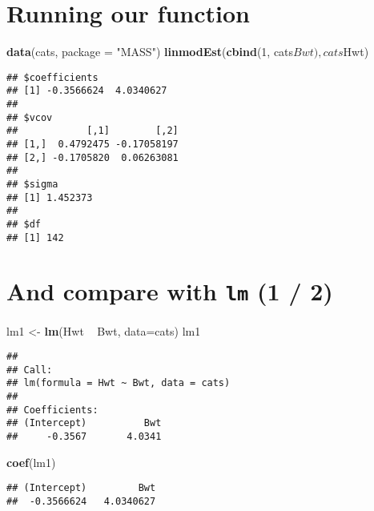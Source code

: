 \documentclass[]{book}
\newenvironment{Shaded}{\begin{snugshade}}{\end{snugshade}}
\newcommand{\KeywordTok}[1]{\textcolor[rgb]{0.13,0.29,0.53}{\textbf{{#1}}}}
\newcommand{\DataTypeTok}[1]{\textcolor[rgb]{0.13,0.29,0.53}{{#1}}}
\newcommand{\DecValTok}[1]{\textcolor[rgb]{0.00,0.00,0.81}{{#1}}}
\newcommand{\StringTok}[1]{\textcolor[rgb]{0.31,0.60,0.02}{{#1}}}
\newcommand{\NormalTok}[1]{{#1}}
\theoremstyle{definition}
\theoremstyle{definition}
\theoremstyle{definition}
\theoremstyle{remark}
\begin{document}
\section{Running our function}\label{running-our-function}

\begin{Shaded}
\begin{Highlighting}[]
\KeywordTok{data}\NormalTok{(cats, }\DataTypeTok{package =} \StringTok{"MASS"}\NormalTok{)}
\KeywordTok{linmodEst}\NormalTok{(}\KeywordTok{cbind}\NormalTok{(}\DecValTok{1}\NormalTok{, cats$Bwt), cats$Hwt)}
\end{Highlighting}
\end{Shaded}

\begin{verbatim}
## $coefficients
## [1] -0.3566624  4.0340627
## 
## $vcov
##            [,1]        [,2]
## [1,]  0.4792475 -0.17058197
## [2,] -0.1705820  0.06263081
## 
## $sigma
## [1] 1.452373
## 
## $df
## [1] 142
\end{verbatim}

\section{\texorpdfstring{And compare with \texttt{lm} (1 /
2)}{And compare with lm (1 / 2)}}\label{and-compare-with-lm-1-2}

\begin{Shaded}
\begin{Highlighting}[]
\NormalTok{lm1 <-}\StringTok{ }\KeywordTok{lm}\NormalTok{(Hwt ~}\StringTok{ }\NormalTok{Bwt, }\DataTypeTok{data=}\NormalTok{cats)}
\NormalTok{lm1}
\end{Highlighting}
\end{Shaded}

\begin{verbatim}
## 
## Call:
## lm(formula = Hwt ~ Bwt, data = cats)
## 
## Coefficients:
## (Intercept)          Bwt  
##     -0.3567       4.0341
\end{verbatim}

\begin{Shaded}
\begin{Highlighting}[]
\KeywordTok{coef}\NormalTok{(lm1)}
\end{Highlighting}
\end{Shaded}

\begin{verbatim}
## (Intercept)         Bwt 
##  -0.3566624   4.0340627
\end{verbatim}
\end{document}
